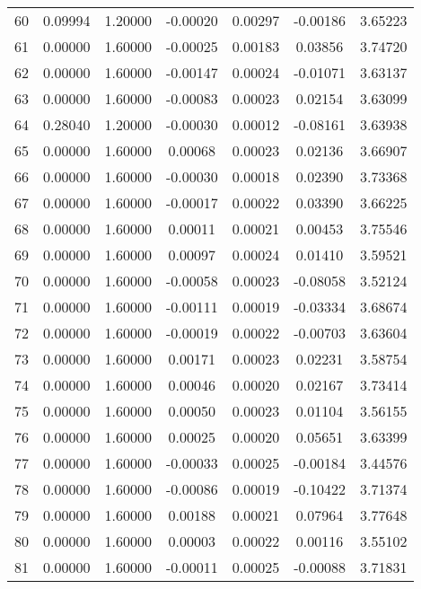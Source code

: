 \begin{longtable}{c c c c c c c}
60  &  0.09994 &      1.20000 & -0.00020 &   0.00297 &  -0.00186 &   3.65223 \\
61  &  0.00000 &      1.60000 & -0.00025 &   0.00183 &   0.03856 &   3.74720 \\
62  &  0.00000 &      1.60000 & -0.00147 &   0.00024 &  -0.01071 &   3.63137 \\
63  &  0.00000 &      1.60000 & -0.00083 &   0.00023 &   0.02154 &   3.63099 \\
64  &  0.28040 &      1.20000 & -0.00030 &   0.00012 &  -0.08161 &   3.63938 \\
65  &  0.00000 &      1.60000 &  0.00068 &   0.00023 &   0.02136 &   3.66907 \\
66  &  0.00000 &      1.60000 & -0.00030 &   0.00018 &   0.02390 &   3.73368 \\
67  &  0.00000 &      1.60000 & -0.00017 &   0.00022 &   0.03390 &   3.66225 \\
68  &  0.00000 &      1.60000 &  0.00011 &   0.00021 &   0.00453 &   3.75546 \\
69  &  0.00000 &      1.60000 &  0.00097 &   0.00024 &   0.01410 &   3.59521 \\
70  &  0.00000 &      1.60000 & -0.00058 &   0.00023 &  -0.08058 &   3.52124 \\
71  &  0.00000 &      1.60000 & -0.00111 &   0.00019 &  -0.03334 &   3.68674 \\
72  &  0.00000 &      1.60000 & -0.00019 &   0.00022 &  -0.00703 &   3.63604 \\
73  &  0.00000 &      1.60000 &  0.00171 &   0.00023 &   0.02231 &   3.58754 \\
74  &  0.00000 &      1.60000 &  0.00046 &   0.00020 &   0.02167 &   3.73414 \\
75  &  0.00000 &      1.60000 &  0.00050 &   0.00023 &   0.01104 &   3.56155 \\
76  &  0.00000 &      1.60000 &  0.00025 &   0.00020 &   0.05651 &   3.63399 \\
77  &  0.00000 &      1.60000 & -0.00033 &   0.00025 &  -0.00184 &   3.44576 \\
78  &  0.00000 &      1.60000 & -0.00086 &   0.00019 &  -0.10422 &   3.71374 \\
79  &  0.00000 &      1.60000 &  0.00188 &   0.00021 &   0.07964 &   3.77648 \\
80  &  0.00000 &      1.60000 &  0.00003 &   0.00022 &   0.00116 &   3.55102 \\
81  &  0.00000 &      1.60000 & -0.00011 &   0.00025 &  -0.00088 &   3.71831 \\

\end{longtable}
